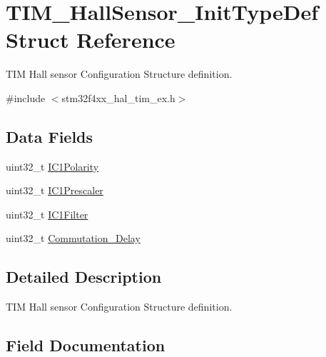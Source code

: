 \hypertarget{struct_t_i_m___hall_sensor___init_type_def}{}\section{T\+I\+M\+\_\+\+Hall\+Sensor\+\_\+\+Init\+Type\+Def Struct Reference}
\label{struct_t_i_m___hall_sensor___init_type_def}


T\+IM Hall sensor Configuration Structure definition.  




{\ttfamily \#include $<$stm32f4xx\+\_\+hal\+\_\+tim\+\_\+ex.\+h$>$}

\subsection*{Data Fields}
\begin{DoxyCompactItemize}
\item 
uint32\+\_\+t \hyperlink{struct_t_i_m___hall_sensor___init_type_def_a08e8f098cb51159344135bab57d82d85}{I\+C1\+Polarity}
\item 
uint32\+\_\+t \hyperlink{struct_t_i_m___hall_sensor___init_type_def_ac6c54e891cbe5afec92676219978209e}{I\+C1\+Prescaler}
\item 
uint32\+\_\+t \hyperlink{struct_t_i_m___hall_sensor___init_type_def_a2d349ca17282be59dd09dc9b10948d24}{I\+C1\+Filter}
\item 
uint32\+\_\+t \hyperlink{struct_t_i_m___hall_sensor___init_type_def_a822efefca8a13af284e84070bd19bb91}{Commutation\+\_\+\+Delay}
\end{DoxyCompactItemize}


\subsection{Detailed Description}
T\+IM Hall sensor Configuration Structure definition. 

\subsection{Field Documentation}
\mbox{\label{struct_t_i_m___hall_sensor___init_type_def_a822efefca8a13af284e84070bd19bb91}} 
